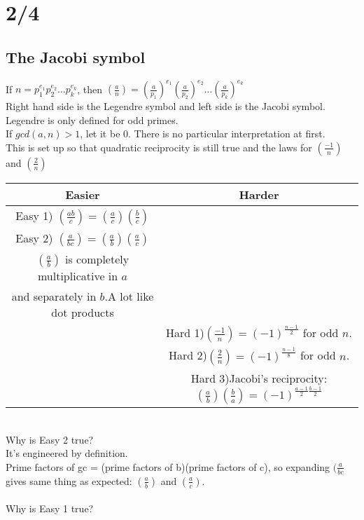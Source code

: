 \section*{2/4}
  \subsection*{The Jacobi symbol}
    If $n = p_1^{e_1}p_2^{e_2} \ldots p_k^{e_k}$,
    then $(\frac{a}{n}) = (\frac{a}{p_1})^{e_1}(\frac{a}{p_2})^{e_2} \ldots
      (\frac{a}{p_k})^{e_k}$\\
    Right hand side is the Legendre symbol and left side is the Jacobi symbol.\\
    Legendre is only defined for odd primes.\\
    If $gcd(a,n) > 1$, let it be 0.
    There is no particular interpretation at first.\\
    This is set up so that quadratic reciprocity is still true and the laws for
    $(\frac{-1}{n})$ and $(\frac{2}{n})$\\
    \begin{tabular}{|c|c|}
      \hline
      Easier & Harder\\
      \hline
      Easy 1) $(\frac{ab}{c}) = (\frac{a}{c})(\frac{b}{c})$ & \\
      \hline
      Easy 2) $(\frac{a}{bc}) = (\frac{a}{b})(\frac{a}{c})$ & \\
      \hline
      $(\frac{a}{b})$ is completely multiplicative in $a$ & \\
      and separately in $b$.A lot like dot products & \\
      \hline
      & Hard 1)$(\frac{-1}{n}) = (-1)^{\frac{n-1}{2}}$ for odd $n$.\\
      \hline
      & Hard 2)$(\frac{2}{n}) = (-1)^{\frac{n-1}{8}}$ for odd $n$.\\
      \hline
      & Hard 3)Jacobi's reciprocity: $(\frac{a}{b})(\frac{b}{a}) = 
      (-1)^{\frac{a-1}{2}\frac{b-1}{2}}$\\
      \hline
    \end{tabular}\\
    Why is Easy 2 true?\\
    It's engineered by definition.\\
    Prime factors of gc = (prime factors of b)(prime factors of c), so
    expanding $(\frac{a}{bc}$ gives same thing as expected: $(\frac{a}{b})$ and
    $(\frac{a}{c})$.\\\\
    Why is Easy 1 true?\\
